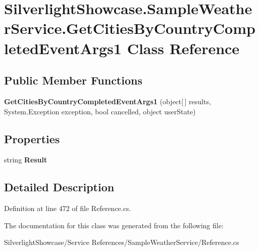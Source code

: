 \hypertarget{class_silverlight_showcase_1_1_sample_weather_service_1_1_get_cities_by_country_completed_event_args1}{
\section{SilverlightShowcase.SampleWeatherService.GetCitiesByCountryCompletedEventArgs1 Class Reference}
\label{class_silverlight_showcase_1_1_sample_weather_service_1_1_get_cities_by_country_completed_event_args1}
}
\subsection*{Public Member Functions}
\begin{DoxyCompactItemize}
\item 
\hypertarget{class_silverlight_showcase_1_1_sample_weather_service_1_1_get_cities_by_country_completed_event_args1_a4118dbcfd20338eb51c6c0fad38b3fdc}{
{\bfseries GetCitiesByCountryCompletedEventArgs1} (object\mbox{[}$\,$\mbox{]} results, System.Exception exception, bool cancelled, object userState)}
\label{class_silverlight_showcase_1_1_sample_weather_service_1_1_get_cities_by_country_completed_event_args1_a4118dbcfd20338eb51c6c0fad38b3fdc}

\end{DoxyCompactItemize}
\subsection*{Properties}
\begin{DoxyCompactItemize}
\item 
\hypertarget{class_silverlight_showcase_1_1_sample_weather_service_1_1_get_cities_by_country_completed_event_args1_a4713dd1d55dbd430cc15200bd89d3bc9}{
string {\bfseries Result}}
\label{class_silverlight_showcase_1_1_sample_weather_service_1_1_get_cities_by_country_completed_event_args1_a4713dd1d55dbd430cc15200bd89d3bc9}

\end{DoxyCompactItemize}


\subsection{Detailed Description}


Definition at line 472 of file Reference.cs.

The documentation for this class was generated from the following file:\begin{DoxyCompactItemize}
\item 
SilverlightShowcase/Service References/SampleWeatherService/Reference.cs\end{DoxyCompactItemize}

